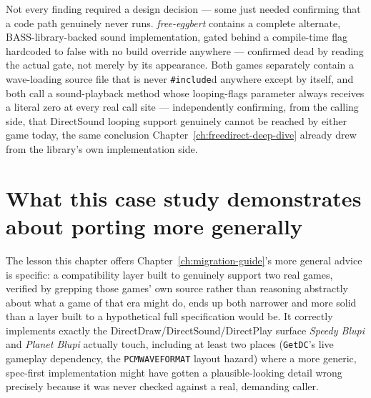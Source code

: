 Not every finding required a design decision --- some just needed confirming that a code path
genuinely never runs. \emph{free-eggbert} contains a complete alternate, BASS-library-backed
sound implementation, gated behind a compile-time flag hardcoded to false with no build
override anywhere --- confirmed dead by reading the actual gate, not merely by its
appearance. Both games separately contain a wave-loading source file that is never
\texttt{\#include}d anywhere except by itself, and both call a sound-playback method whose
looping-flags parameter always receives a literal zero at every real call site --- independently
confirming, from the calling side, that DirectSound looping support genuinely cannot be
reached by either game today, the same conclusion Chapter~\ref{ch:freedirect-deep-dive}
already drew from the library's own implementation side.

\section{What this case study demonstrates about porting more generally}

The lesson this chapter offers Chapter~\ref{ch:migration-guide}'s more general advice is
specific: a compatibility layer built to genuinely support two real games, verified by
grepping those games' own source rather than reasoning abstractly about what a game of that
era might do, ends up both narrower and more solid than a layer built to a hypothetical full
specification would be. It correctly implements exactly the DirectDraw/DirectSound/DirectPlay
surface \emph{Speedy Blupi} and \emph{Planet Blupi} actually touch, including at least two
places (\texttt{GetDC}'s live gameplay dependency, the \texttt{PCMWAVEFORMAT} layout hazard)
where a more generic, spec-first implementation might have gotten a plausible-looking detail
wrong precisely because it was never checked against a real, demanding caller.
